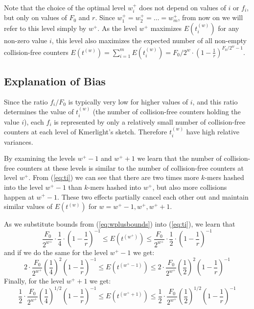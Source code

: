 \medskip

Note that the choice of the optimal level $w_i^+$ does not depend on values of $i$ or $f_i$,
but only on values of $F_0$ and $r$. Since $w_1^+ = w_2^+ = \dots = w_m^+$, from now on 
we will refer to this level simply by $w^+$.
As the level $w^+$ maximizes $E(t_i^{(w)})$ for any non-zero value $i$, 
this level also maximizes the expected number of all non-empty collision-free counters
$E(t^{(w)}) = \sum_{i=1}^m E(t_i^{(w)}) = F_0 / 2^w \cdot
\left(1 - \frac{1}{r}\right)^{F_0/2^w - 1} $.


\subsection{Explanation of Bias}
Since the ratio $f_i / F_0$ is typically very low for higher values of $i$, and this
ratio determines the value of $t_i^{(w)}$ (the number of collision-free counters holding
the value $i$), each $f_i$ is represented by only a relatively small number of collision-free
counters at each level of Kmerlight's sketch. Therefore $t_i^{(w)}$ have high relative variances. 


By examining the levels $w^+-1$ and $w^++1$ we learn that the number of collision-free
counters at these levels is similar to the number of collision-free counters at level $w^+$. 
From (\ref{eq:ti}) we can see that there are two times more $k$-mers hashed into the level $w^+-1$
than $k$-mers hashed into $w^+$, but also more collisions happen at $w^+-1$. These
two effects partially cancel each other out and maintain similar values of $E(t^{(w)})$
for $w = w^+-1, w^+, w^++1$.

As we substitute bounds from (\ref{eq:wplusbounds}) into (\ref{eq:ti}), we learn that
$$ 
\frac{F_0}{2^{w^+}} \cdot \frac{1}{4} \cdot \left(1 - \frac{1}{r}\right)^{-1}
\leq E(t^{(w^+)}) \leq 
\frac{F_0}{2^{w^+}} \cdot \frac{1}{2} \cdot \left(1 - \frac{1}{r}\right)^{-1}
$$
and if we do the same for the level $w^+-1$ we get:
$$ 
2 \cdot \frac{F_0}{2^{w^+}} \left(\frac{1}{4}\right)^2 \left(1 - \frac{1}{r}\right)^{-1}
\leq E(t^{(w^+-1)}) \leq 
2 \cdot \frac{F_0}{2^{w^+}} \left(\frac{1}{2}\right)^2 \left(1 - \frac{1}{r}\right)^{-1}
$$
Finally, for the level $w^++1$ we get:
$$ 
\frac{1}{2} \cdot \frac{F_0}{2^{w^+}} \left(\frac{1}{4}\right)^{1/2} \left(1 - \frac{1}{r}\right)^{-1}
\leq E(t^{(w^++1)}) \leq 
\frac{1}{2} \cdot \frac{F_0}{2^{w^+}} \left(\frac{1}{2}\right)^{1/2} \left(1 - \frac{1}{r}\right)^{-1}
$$


